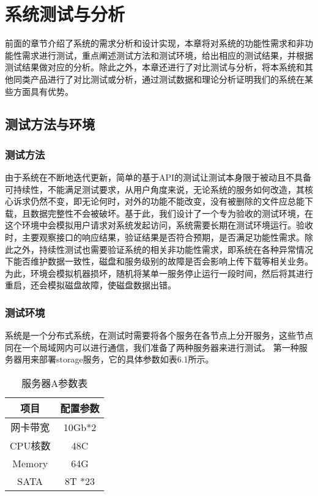
\chapter{系统测试与分析}
前面的章节介绍了系统的需求分析和设计实现，本章将对系统的功能性需求和非功能性需求进行测试，重点阐述测试方法和测试环境，给出相应的测试结果，并根据测试结果做对应的分析。除此之外，本章还进行了对比测试与分析，将本系统和其他同类产品进行了对比测试或分析，通过测试数据和理论分析证明我们的系统在某些方面具有优势。

\section{测试方法与环境}%
\subsection{测试方法}%
由于系统在不断地迭代更新，简单的基于API的测试让测试本身限于被动且不具备可持续性，不能满足测试要求，从用户角度来说，无论系统的服务如何改造，其核心诉求仍然不变，即无论何时，对外的功能不能改变，没有被删除的文件应总能下载，且数据完整性不会被破坏。基于此，我们设计了一个专为验收的测试环境，在这个环境中会模拟用户请求对系统发起访问，系统需要长期在测试环境运行。验收时，主要观察接口的响应结果，验证结果是否符合预期，是否满足功能性需求。除此之外，持续性测试也需要验证系统的相关非功能性需求，即系统在各种异常情况下能否维护数据一致性，磁盘和服务级别的故障是否会影响上传下载等相关业务。为此，环境会模拟机器损坏，随机将某单一服务停止运行一段时间，然后将其进行重启，还会模拟磁盘故障，使磁盘数据出错。

\subsection{测试环境}%
系统是一个分布式系统，在测试时需要将各个服务在各节点上分开服务，这些节点同在一个局域网内可以进行通信，我们准备了两种服务器来进行测试。
第一种服务器用来部署storage服务，它的具体参数如表6.1所示。

\begin{table}[h]
    \centering
    \caption{服务器A参数表}
    \begin{tabular}{cc}
      \toprule
      项目   & 配置参数   \\
      \midrule
      网卡带宽  & 10Gb*2  \\
      CPU核数   & 48C     \\
      Memory   & 64G      \\
      SATA     & 8T *23   \\
      \bottomrule
    \end{tabular}
\end{table}

